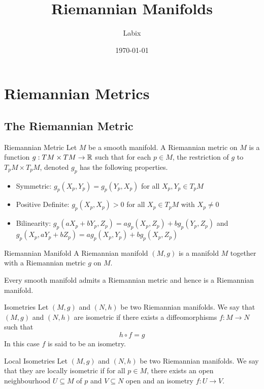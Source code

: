 \documentclass[a4paper]{article}
\title{Riemannian Manifolds}
\author{Labix}
\date{\today}
\begin{document}
\maketitle
\begin{abstract}
\end{abstract}
\pagebreak
\tableofcontents
\pagebreak

\section{Riemannian Metrics}
\subsection{The Riemannian Metric}
\begin{defn}{Riemannian Metric}{} Let $M$ be a smooth manifold. A Riemannian metric on $M$ is a function $g: TM\times TM\to\mathbb{R}$ such that for each $p\in M$, the restriction of $g$ to $T_pM\times T_pM$, denoted $g_p$ has the following properties. 
\begin{itemize}
\item Symmetric: $g_p(X_p,Y_p)=g_p(Y_p,X_p)$ for all $X_p,Y_p\in T_pM$
\item Positive Definite: $g_p(X_p,X_p)>0$ for all $X_p\in T_pM$ with $X_p\neq 0$
\item Bilinearity: $g_p(aX_p+bY_p,Z_p)=ag_p(X_p,Z_p)+bg_p(Y_p,Z_p)$ and $g_p(X_p,aY_p+bZ_p)=ag_p(X_p,Y_p)+bg_p(X_p,Z_p)$
\end{itemize}
\end{defn}

\begin{defn}{Riemannian Manifold}{} A Riemannian manifold $(M,g)$ is a manifold $M$ together with a Riemannian metric $g$ on $M$. 
\end{defn}

\begin{thm}{}{} Every smooth manifold admits a Riemannian metric and hence is a Riemannian manifold. 
\end{thm}

\begin{defn}{Isometries}{} Let $(M,g)$ and $(N,h)$ be two Riemannian manifolds. We say that $(M,g)$ and $(N,h)$ are isometric if there exists a diffeomorphisms $f:M\to N$ such that $$h\circ f=g$$ In this case $f$ is said to be an isometry. 
\end{defn}

\begin{defn}{Local Isometries}{} Let $(M,g)$ and $(N,h)$ be two Riemannian manifolds. We say that they are locally isometric if for all $p\in M$, there exists an open neighbourhood $U\subseteq M$ of $p$ and $V\subseteq N$ open and an isometry $f:U\to V$. 
\end{defn}
\end{document}

